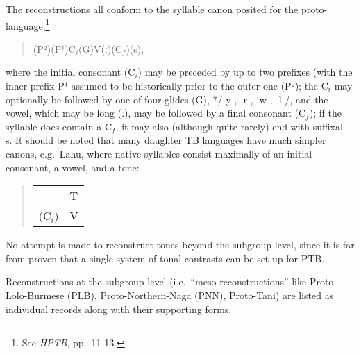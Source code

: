 The reconstructions all conform to the syllable canon posited for the
proto-language,\footnote{See \textit{HPTB}, pp.~11-13.}

\begin{quote}
(P²)\hspace{2em}(P¹)\hspace{2em}$\textrm{C}_i$\hspace{2em}(G)\hspace{2em}V\hspace{2em}(ː)\hspace{2em}($\textrm{C}_f$)\hspace{2em}(s),
\end{quote}


where the initial consonant ($\textrm{C}_i$) may be preceded by up to two prefixes (with the
inner prefix P¹ assumed to be historically prior to the outer one (P²); the $\textrm{C}_i$
may optionally be followed by one of four glides (G), */-y-, -r-, -w-, -l-/, and
the vowel, which may be long (ː), may be followed by a final consonant ($\textrm{C}_f$); if
the syllable does contain a $\textrm{C}_f$, it may also (although quite rarely) end with
suffixal -s.  It should be noted that many daughter TB languages have much
simpler canons, e.g.\ Lahu, where native syllables consist maximally of an
initial consonant, a vowel, and a tone:


\begin{quote}
\begin{tabular}{ll}
	&T\\
($\textrm{C}_i$)	&V\\
\end{tabular}
\end{quote}

No attempt is made to reconstruct tones beyond the subgroup level, since it is
far from proven that a single system of tonal contrasts can be set up for PTB.  


Reconstructions at the subgroup level (i.e.\ “meso-reconstructions” like
Proto-Lolo-Burmese (PLB), Proto-Northern-Naga (PNN), Proto-Tani) are listed as
individual records along with their supporting forms.


